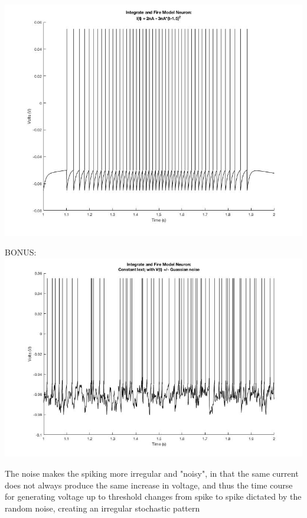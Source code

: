 \documentclass{121Temp}
\begin{document}
\includegraphics[scale=.55]{parabola.jpg}


\hwproblem
BONUS: \\
\includegraphics[scale=.55]{noisy.jpg}

The noise makes the spiking more irregular and "noisy", in that the same current does not always produce the same increase in voltage, and thus the time course for generating voltage up to threshold changes from spike to spike dictated by the random noise, creating an irregular stochastic pattern
\end{document}
